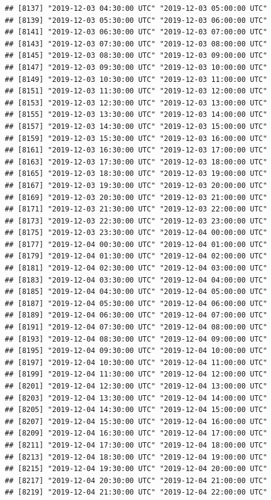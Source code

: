 \documentclass{article}\usepackage[]{graphicx}\usepackage[]{color}
\makeatletter
\newenvironment{kframe}{%
 \def\at@end@of@kframe{}%
 \ifinner\ifhmode%
  \def\at@end@of@kframe{\end{minipage}}%
  \begin{minipage}{\columnwidth}%
 \fi\fi%
 \def\FrameCommand##1{\hskip\@totalleftmargin \hskip-\fboxsep
 \colorbox{shadecolor}{##1}\hskip-\fboxsep
     \hskip-\linewidth \hskip-\@totalleftmargin \hskip\columnwidth}%
 \MakeFramed {\advance\hsize-\width
   \@totalleftmargin\z@ \linewidth\hsize
   \@setminipage}}%
 {\par\unskip\endMakeFramed%
 \at@end@of@kframe}
\newenvironment{knitrout}{}{} %
\makeatother
\begin{document}
\begin{knitrout}
\begin{kframe}
\begin{verbatim}
## [8137] "2019-12-03 04:30:00 UTC" "2019-12-03 05:00:00 UTC"
## [8139] "2019-12-03 05:30:00 UTC" "2019-12-03 06:00:00 UTC"
## [8141] "2019-12-03 06:30:00 UTC" "2019-12-03 07:00:00 UTC"
## [8143] "2019-12-03 07:30:00 UTC" "2019-12-03 08:00:00 UTC"
## [8145] "2019-12-03 08:30:00 UTC" "2019-12-03 09:00:00 UTC"
## [8147] "2019-12-03 09:30:00 UTC" "2019-12-03 10:00:00 UTC"
## [8149] "2019-12-03 10:30:00 UTC" "2019-12-03 11:00:00 UTC"
## [8151] "2019-12-03 11:30:00 UTC" "2019-12-03 12:00:00 UTC"
## [8153] "2019-12-03 12:30:00 UTC" "2019-12-03 13:00:00 UTC"
## [8155] "2019-12-03 13:30:00 UTC" "2019-12-03 14:00:00 UTC"
## [8157] "2019-12-03 14:30:00 UTC" "2019-12-03 15:00:00 UTC"
## [8159] "2019-12-03 15:30:00 UTC" "2019-12-03 16:00:00 UTC"
## [8161] "2019-12-03 16:30:00 UTC" "2019-12-03 17:00:00 UTC"
## [8163] "2019-12-03 17:30:00 UTC" "2019-12-03 18:00:00 UTC"
## [8165] "2019-12-03 18:30:00 UTC" "2019-12-03 19:00:00 UTC"
## [8167] "2019-12-03 19:30:00 UTC" "2019-12-03 20:00:00 UTC"
## [8169] "2019-12-03 20:30:00 UTC" "2019-12-03 21:00:00 UTC"
## [8171] "2019-12-03 21:30:00 UTC" "2019-12-03 22:00:00 UTC"
## [8173] "2019-12-03 22:30:00 UTC" "2019-12-03 23:00:00 UTC"
## [8175] "2019-12-03 23:30:00 UTC" "2019-12-04 00:00:00 UTC"
## [8177] "2019-12-04 00:30:00 UTC" "2019-12-04 01:00:00 UTC"
## [8179] "2019-12-04 01:30:00 UTC" "2019-12-04 02:00:00 UTC"
## [8181] "2019-12-04 02:30:00 UTC" "2019-12-04 03:00:00 UTC"
## [8183] "2019-12-04 03:30:00 UTC" "2019-12-04 04:00:00 UTC"
## [8185] "2019-12-04 04:30:00 UTC" "2019-12-04 05:00:00 UTC"
## [8187] "2019-12-04 05:30:00 UTC" "2019-12-04 06:00:00 UTC"
## [8189] "2019-12-04 06:30:00 UTC" "2019-12-04 07:00:00 UTC"
## [8191] "2019-12-04 07:30:00 UTC" "2019-12-04 08:00:00 UTC"
## [8193] "2019-12-04 08:30:00 UTC" "2019-12-04 09:00:00 UTC"
## [8195] "2019-12-04 09:30:00 UTC" "2019-12-04 10:00:00 UTC"
## [8197] "2019-12-04 10:30:00 UTC" "2019-12-04 11:00:00 UTC"
## [8199] "2019-12-04 11:30:00 UTC" "2019-12-04 12:00:00 UTC"
## [8201] "2019-12-04 12:30:00 UTC" "2019-12-04 13:00:00 UTC"
## [8203] "2019-12-04 13:30:00 UTC" "2019-12-04 14:00:00 UTC"
## [8205] "2019-12-04 14:30:00 UTC" "2019-12-04 15:00:00 UTC"
## [8207] "2019-12-04 15:30:00 UTC" "2019-12-04 16:00:00 UTC"
## [8209] "2019-12-04 16:30:00 UTC" "2019-12-04 17:00:00 UTC"
## [8211] "2019-12-04 17:30:00 UTC" "2019-12-04 18:00:00 UTC"
## [8213] "2019-12-04 18:30:00 UTC" "2019-12-04 19:00:00 UTC"
## [8215] "2019-12-04 19:30:00 UTC" "2019-12-04 20:00:00 UTC"
## [8217] "2019-12-04 20:30:00 UTC" "2019-12-04 21:00:00 UTC"
## [8219] "2019-12-04 21:30:00 UTC" "2019-12-04 22:00:00 UTC"

\end{verbatim}
\end{kframe}
\end{knitrout}
\end{document}
